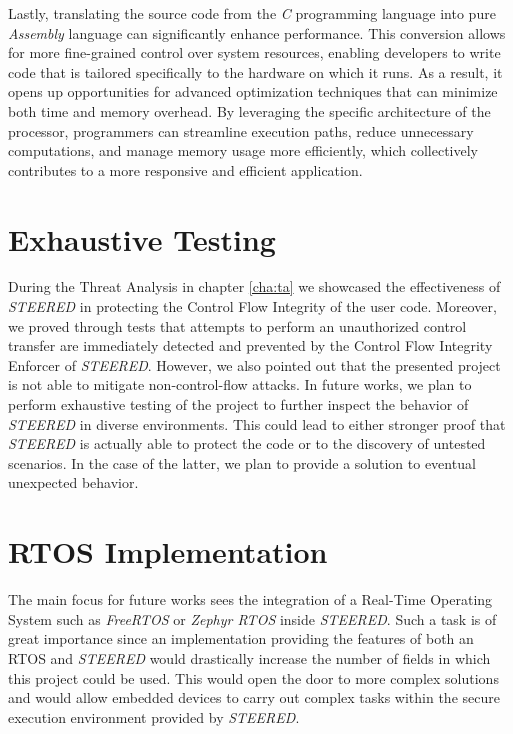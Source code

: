 Lastly, translating the source code from the \textit{C} programming language into
pure \textit{Assembly} language can significantly enhance performance. This conversion
allows for more fine-grained control over system resources, enabling developers
to write code that is tailored specifically to the hardware on which it runs. As
a result, it opens up opportunities for advanced optimization techniques that
can minimize both time and memory overhead. By leveraging the specific architecture
of the processor, programmers can streamline execution paths, reduce unnecessary
computations, and manage memory usage more efficiently, which collectively contributes
to a more responsive and efficient application.

\section{Exhaustive Testing}
\label{sec:future_testing}

During the Threat Analysis in chapter \ref{cha:ta} we showcased the
effectiveness of \textit{STEERED} in protecting the Control Flow Integrity of the
user code. Moreover, we proved through tests that attempts to perform an unauthorized
control transfer are immediately detected and prevented by the Control Flow Integrity
Enforcer of \textit{STEERED}. However, we also pointed out that the presented
project is not able to mitigate non-control-flow attacks. In future works, we
plan to perform exhaustive testing of the project to further inspect the
behavior of \textit{STEERED} in diverse environments. This could lead to either
stronger proof that \textit{STEERED} is actually able to protect the code or to the
discovery of untested scenarios. In the case of the latter, we plan to provide a
solution to eventual unexpected behavior.

\section{RTOS Implementation}
\label{sec:future_rtos}

The main focus for future works sees the integration of a Real-Time Operating
System such as \textit{FreeRTOS} or \textit{Zephyr RTOS} inside \textit{STEERED}.
Such a task is of great importance since an implementation providing the
features of both an RTOS and \textit{STEERED} would drastically increase the number
of fields in which this project could be used. This would open the door to more
complex solutions and would allow embedded devices to carry out complex tasks
within the secure execution environment provided by \textit{STEERED}.

